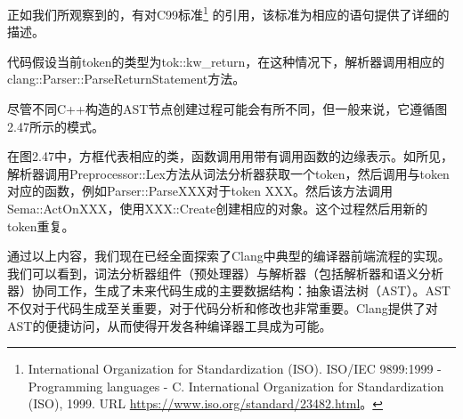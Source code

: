 正如我们所观察到的，有对C99标准\footnote{International Organization for Standardization (ISO). ISO/IEC 9899:1999 - Programming languages - C. International Organization for Standardization (ISO), 1999. URL \url{https://www.iso.org/standard/23482.html}。} 的引用，该标准为相应的语句提供了详细的描述。

代码假设当前token的类型为tok::kw\_return，在这种情况下，解析器调用相应的clang::Parser::ParseReturnStatement方法。

尽管不同C++构造的AST节点创建过程可能会有所不同，但一般来说，它遵循图2.47所示的模式。


在图2.47中，方框代表相应的类，函数调用用带有调用函数的边缘表示。如所见，解析器调用Preprocessor::Lex方法从词法分析器获取一个token，然后调用与token对应的函数，例如Parser::ParseXXX对于token XXX。然后该方法调用Sema::ActOnXXX，使用XXX::Create创建相应的对象。这个过程然后用新的token重复。

通过以上内容，我们现在已经全面探索了Clang中典型的编译器前端流程的实现。我们可以看到，词法分析器组件（预处理器）与解析器（包括解析器和语义分析器）协同工作，生成了未来代码生成的主要数据结构：抽象语法树（AST）。AST不仅对于代码生成至关重要，对于代码分析和修改也非常重要。Clang提供了对AST的便捷访问，从而使得开发各种编译器工具成为可能。













